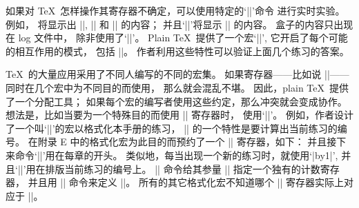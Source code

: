 \danger \1如果对 \TeX\ 怎样操作其寄存器不确定，可以使用特定的`|\show|'命令%
进行实时实验。%
例如，
\begintt
\showthe{}  \showthe{}  \showthe{}
\endtt
将显示出 ||, || 和 || 的内容；
并且`||'将显示 || 的内容。%
盒子的内容只出现在 log 文件中，
除非使用了`||'。%
Plain \TeX\ 提供了一个宏`|\tracingall|', 它开启了每个可能的相互作用的模式，
包括 |\tracingonline|。%
作者利用这些特性可以验证上面几个练习的答案。

\danger  \TeX\ 的大量应用采用了不同人编写的不同的宏集。%
如果寄存器——比如说 ||——同时在几个宏中为不同目的而使用，
那么就会混乱不堪。%
因此，plain \TeX\ 提供了一个分配工具；
如果每个宏的编写者使用这些约定，那么冲突就会变成协作。%
想法是，比如当要为一个特殊目的而使用 |\count| 寄存器\hbox{时，} 使用`|\newcount|'。%
例如，作者设计了一个叫`|\exercise|'的宏以格式化本手册的练习，
|\exercise| 的一个特性是要计算出当前练习的编号。%
在附录 E 中的格式化宏为此目的而预约了一个 |\count| 寄存器，如下：
\begintt
\newcount\exno
\endtt
并且接下来命令`||'用在每章的开头。%
类似地，每当出现一个新的练习时，就使用`|\advance\exno by1|',
并且`|\the\exno|'用在排版当前练习的编号上。%
|\newcount| 命令给其参量 |\exno| 指定一个独有的计数寄存器，
并且用 |\countdef| 命令来定义 |\exno|。%
所有的其它格式化宏不知道哪个 |\count| 寄存器实际上对应于 |\exno|。

